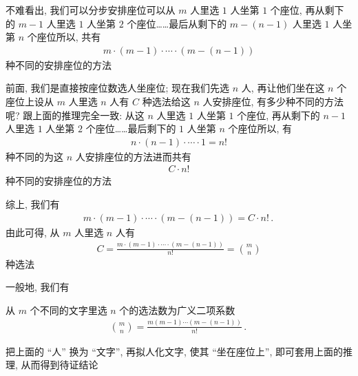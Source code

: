 不难看出, 我们可以分步安排座位\period 可以从 $m$ 人里选 $1$ 人坐第 $1$ 个座位, 再从剩下的 $m-1$ 人里选 $1$ 人坐第 $2$ 个座位……最后从剩下的 $m - (n - 1)$ 人里选 $1$ 人坐第 $n$ 个座位\period 所以, 共有
\begin{align*}
    m \cdot (m-1) \cdot \cdots \cdot (m - (n - 1))
\end{align*}
种不同的安排座位的方法\period

前面, 我们是直接按座位数选人坐座位; 现在我们先选 $n$ 人, 再让他们坐在这 $n$ 个座位上\period 设从 $m$ 人里选 $n$ 人有 $C$ 种选法\period 给这 $n$ 人安排座位, 有多少种不同的方法呢? 跟上面的推理完全一致: 从这 $n$ 人里选 $1$ 人坐第 $1$ 个座位, 再从剩下的 $n-1$ 人里选 $1$ 人坐第 $2$ 个座位……最后剩下的 $1$ 人坐第 $n$ 个座位\period 所以, 有
\begin{align*}
    n \cdot (n - 1) \cdot \cdots \cdot 1 = n!
\end{align*}
种不同的为这 $n$ 人安排座位的方法\period 进而共有
\begin{align*}
    C \cdot n!
\end{align*}
种不同的安排座位的方法\period

综上, 我们有
\begin{align*}
    m \cdot (m-1) \cdot \cdots \cdot (m - (n - 1)) = C \cdot n! \period
\end{align*}
由此可得, 从 $m$ 人里选 $n$ 人有
\begin{align*}
    C = \frac{m \cdot (m-1) \cdot \cdots \cdot (m - (n - 1))}{n!} = \binom{m}{n}
\end{align*}
种选法\period

一般地, 我们有

\begin{proposition}
    从 $m$ 个不同的文字里选 $n$ 个的选法数为广义二项系数
    \begin{align*}
        \binom{m}{n} = \frac{m(m-1)\cdots(m - (n - 1))}{n!} \period
    \end{align*}
\end{proposition}

\begin{pf}
    把上面的 ``人'' 换为 ``文字'', 再拟人化文字, 使其 ``坐在座位上'', 即可套用上面的推理, 从而得到待证结论\period
\end{pf}

